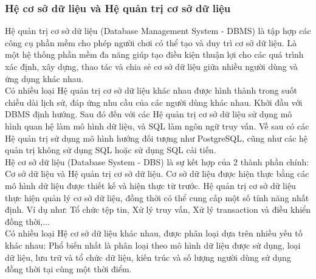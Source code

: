 \subsubsection{Hệ cơ sở dữ liệu và Hệ quản trị cơ sở dữ liệu}
\hspace*{0.5cm} Hệ quản trị cơ sở dữ liệu (Database Management System - DBMS) là tập hợp các công cụ phần mềm cho phép người chơi có thể tạo và duy trì cơ sở dữ liệu. Là một hệ thống phần mềm đa năng giúp tạo điều kiện thuận lợi cho các quá trình xác định, xây dựng, thao tác và chia sẻ cơ sở dữ liệu giữa nhiều người dùng và ứng dụng khác nhau.\\
\hspace*{0.5cm} Có nhiều loại Hệ quản trị cơ sở dữ liệu khác nhau được hình thành trong suốt chiều dài lịch sử, đáp ứng nhu cầu của các người dùng khác nhau. Khởi đầu với DBMS định hướng. Sau đó đến với các Hệ quản trị cơ sở dữ liệu sử dụng mô hình quan hệ làm mô hình dữ liệu, và SQL làm ngôn ngữ truy vấn. Về sau có các Hệ quản trị sử dụng mô hình hướng đối tượng như PostgreSQL, cũng như các hệ quản trị không sử dụng SQL hoặc sử dụng SQL cải tiến.\\
\hspace*{0.5cm} Hệ cơ sở dữ liệu (Database System - DBS) là sự kết hợp của 2 thành phần chính: Cơ sở dữ liệu và Hệ quản trị cơ sở dữ liệu. Cơ sở dữ liệu được hiện thực bằng các mô hình dữ liệu được thiết kế và hiện thực từ trước. Hệ quản trị cơ sở dữ liệu thực hiện quản lý cơ sở dữ liệu, đồng thời có thể cung cấp một số tính năng nhất định. Ví dụ như: Tổ chức tệp tin, Xử lý truy vấn, Xử lý transaction và điều khiển đồng thời,...\\
\hspace*{0.5cm} Có nhiều loại Hệ cơ sở dữ liệu khác nhau, được phân loại dựa trên nhiều yếu tố khác nhau: Phổ biến nhất là phân loại theo mô hình dữ liệu được sử dụng, loại dữ liệu, lưu trữ và tổ chức dữ liệu, kiến trúc và số lượng người dùng sử dụng đồng thời tại cùng một thời điểm.
